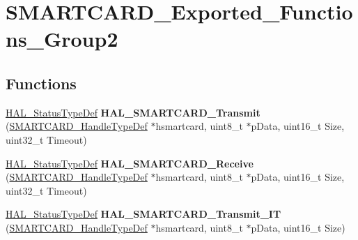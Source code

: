 \hypertarget{group___s_m_a_r_t_c_a_r_d___exported___functions___group2}{}\section{S\+M\+A\+R\+T\+C\+A\+R\+D\+\_\+\+Exported\+\_\+\+Functions\+\_\+\+Group2}
\label{group___s_m_a_r_t_c_a_r_d___exported___functions___group2}
\subsection*{Functions}
\begin{DoxyCompactItemize}
\item 
\mbox{\label{group___s_m_a_r_t_c_a_r_d___exported___functions___group2_ga6fc4e733cba772df5e60580fb58135bd}} 
\hyperlink{stm32f0xx__hal__def_8h_a63c0679d1cb8b8c684fbb0632743478f}{H\+A\+L\+\_\+\+Status\+Type\+Def} {\bfseries H\+A\+L\+\_\+\+S\+M\+A\+R\+T\+C\+A\+R\+D\+\_\+\+Transmit} (\hyperlink{struct_s_m_a_r_t_c_a_r_d___handle_type_def}{S\+M\+A\+R\+T\+C\+A\+R\+D\+\_\+\+Handle\+Type\+Def} $\ast$hsmartcard, uint8\+\_\+t $\ast$p\+Data, uint16\+\_\+t Size, uint32\+\_\+t Timeout)
\item 
\mbox{\label{group___s_m_a_r_t_c_a_r_d___exported___functions___group2_ga76a737413971e6a9f9b73d4d5417ded7}} 
\hyperlink{stm32f0xx__hal__def_8h_a63c0679d1cb8b8c684fbb0632743478f}{H\+A\+L\+\_\+\+Status\+Type\+Def} {\bfseries H\+A\+L\+\_\+\+S\+M\+A\+R\+T\+C\+A\+R\+D\+\_\+\+Receive} (\hyperlink{struct_s_m_a_r_t_c_a_r_d___handle_type_def}{S\+M\+A\+R\+T\+C\+A\+R\+D\+\_\+\+Handle\+Type\+Def} $\ast$hsmartcard, uint8\+\_\+t $\ast$p\+Data, uint16\+\_\+t Size, uint32\+\_\+t Timeout)
\item 
\mbox{\label{group___s_m_a_r_t_c_a_r_d___exported___functions___group2_ga5ead500d4e2ca29e0a11d18db76a45b2}} 
\hyperlink{stm32f0xx__hal__def_8h_a63c0679d1cb8b8c684fbb0632743478f}{H\+A\+L\+\_\+\+Status\+Type\+Def} {\bfseries H\+A\+L\+\_\+\+S\+M\+A\+R\+T\+C\+A\+R\+D\+\_\+\+Transmit\+\_\+\+IT} (\hyperlink{struct_s_m_a_r_t_c_a_r_d___handle_type_def}{S\+M\+A\+R\+T\+C\+A\+R\+D\+\_\+\+Handle\+Type\+Def} $\ast$hsmartcard, uint8\+\_\+t $\ast$p\+Data, uint16\+\_\+t Size)

\end{DoxyCompactItemize}

